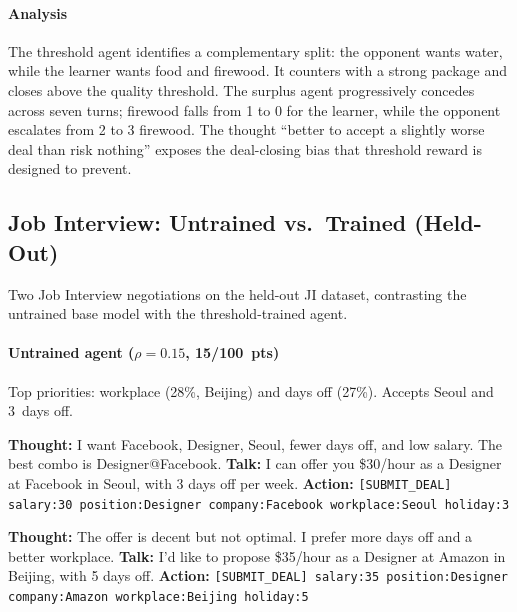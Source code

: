 \documentclass{interact}
\theoremstyle{plain}
\theoremstyle{definition}
\theoremstyle{remark}
\begin{document}
\paragraph{Analysis} The threshold agent identifies a complementary split: the opponent wants water, while the learner wants food and firewood. It counters with a strong package and closes above the quality threshold. The surplus agent progressively concedes across seven turns; firewood falls from 1 to 0 for the learner, while the opponent escalates from 2 to 3 firewood. The thought ``better to accept a slightly worse deal than risk nothing'' exposes the deal-closing bias that threshold reward is designed to prevent.

\subsection{Job Interview: Untrained vs.\ Trained (Held-Out)}

Two Job Interview negotiations on the held-out JI dataset, contrasting the untrained base model with the threshold-trained agent.

\paragraph{Untrained agent ($\rho = 0.15$, 15/100~pts)} Top priorities: workplace (28\%, Beijing) and days off (27\%). Accepts Seoul and 3~days off.

\begin{recruiterbox}
\textbf{Thought:} I want Facebook, Designer, Seoul, fewer days off, and low salary. The best combo is Designer@Facebook.\newline
\textbf{Talk:} I can offer you \$30/hour as a Designer at Facebook in Seoul, with 3 days off per week.\newline
\textbf{Action:} \texttt{[SUBMIT\_DEAL] salary:30 position:Designer company:Facebook workplace:Seoul holiday:3}
\end{recruiterbox}

\begin{applicantbox}
\textbf{Thought:} The offer is decent but not optimal. I prefer more days off and a better workplace.\newline
\textbf{Talk:} I'd like to propose \$35/hour as a Designer at Amazon in Beijing, with 5 days off.\newline
\textbf{Action:} \texttt{[SUBMIT\_DEAL] salary:35 position:Designer company:Amazon workplace:Beijing holiday:5}
\end{applicantbox}
\end{document}
